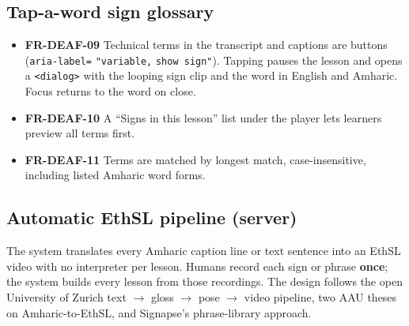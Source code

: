 \documentclass[11pt,a4paper]{article}
\newcommand{\code}[1]{\texttt{#1}}
\newcommand{\req}[1]{\textbf{#1}}
\begin{document}
\subsection{Tap-a-word sign glossary}
\begin{itemize}
  \item \req{FR-DEAF-09} Technical terms in the transcript and captions are buttons (\code{aria-label=} \code{"variable,} \code{show sign"}). Tapping pauses the lesson and opens a \code{<dialog>} with the looping sign clip and the word in English and Amharic. Focus returns to the word on close.
  \item \req{FR-DEAF-10} A ``Signs in this lesson'' list under the player lets learners preview all terms first.
  \item \req{FR-DEAF-11} Terms are matched by longest match, case-insensitive, including listed Amharic word forms.
\end{itemize}

\subsection{Automatic EthSL pipeline (server)}\label{sec:ethsl}
The system translates every Amharic caption line or text sentence into an EthSL video with no interpreter per lesson. Humans record each sign or phrase \textbf{once}; the system builds every lesson from those recordings. The design follows the open University of Zurich text $\rightarrow$ gloss $\rightarrow$ pose $\rightarrow$ video pipeline, two AAU theses on Amharic-to-EthSL, and Signapse's phrase-library approach.
\end{document}
